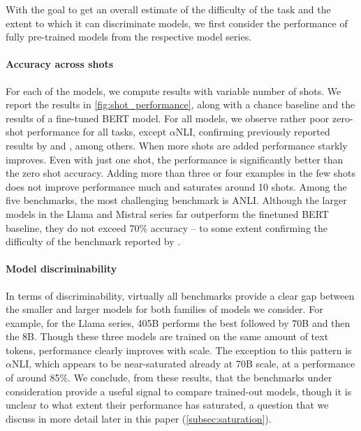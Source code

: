 With the goal to get an overall estimate of the difficulty of the task and the extent to which it can discriminate models, we first consider the performance of fully pre-trained models from the respective model series.

\paragraph{Accuracy across shots}
For each of the models, we compute results with variable number of shots.
We report the results in \cref{fig:shot_performance}, along with a chance baseline and the results of a fine-tuned BERT model.
For all models, we observe rather poor zero-shot performance for all tasks, except $\alpha$NLI, confirming previously reported results by \citet{ohmer2024form} and \citet{weber-etal-2023-mind}, among others.
When more shots are added performance starkly improves.
Even with just one shot, the performance is significantly better than the zero shot accuracy.
Adding more than three or four examples in the few shots does not improve performance much and saturates around 10 shots. 
Among the five benchmarks, the most challenging benchmark is ANLI.
Although the larger models in the Llama and Mistral series far outperform the finetuned BERT baseline, they do not exceed 70\% accuracy -- to some extent confirming the difficulty of the benchmark reported by \citet{brown2020language}.

\paragraph{Model discriminability}
In terms of discriminability, virtually all benchmarks provide a clear gap between the smaller and larger models for both families of models we consider.
For example, for the Llama series, 405B performs the best followed by 70B and then the 8B.
Though these three models are trained on the same amount of text tokens, performance clearly improves with scale.
The exception to this pattern is $\alpha$NLI, which appears to be near-saturated already at 70B scale, at a performance of around 85\%.
We conclude, from these results, that the benchmarks under consideration provide a useful signal to compare trained-out models, though it is unclear to what extent their performance has saturated, a question that we discuss in more detail later in this paper (\cref{subsec:saturation}).

